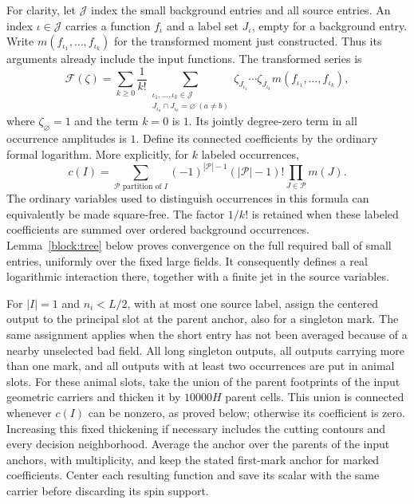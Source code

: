 For clarity, let $\mathcal J$ index the small background entries and all
source entries.  An index $\iota\in\mathcal J$ carries a function
$f_\iota$ and a label set $J_\iota$, empty for a background entry.  Write
$m(f_{\iota_1},\ldots,f_{\iota_k})$ for the transformed moment just
constructed.  Thus its arguments already include the input functions.
The transformed series is
\begin{equation}
 \mathcal F(\zeta)=\sum_{k\ge0}\frac1{k!}
    \sum_{\substack{\iota_1,\ldots,\iota_k\in\mathcal J\\
                  J_{\iota_a}\cap J_{\iota_b}=\varnothing\ (a\ne b)}}
       \zeta_{J_{\iota_1}}\cdots\zeta_{J_{\iota_k}}
                    m(f_{\iota_1},\ldots,f_{\iota_k}),
 \label{block:moment-series}
\end{equation}
where $\zeta_\varnothing=1$ and the term $k=0$ is $1$.
Its jointly degree-zero term in all occurrence amplitudes is $1$.
Define its connected coefficients by the ordinary formal logarithm.
More explicitly, for $k$ labeled occurrences,
\begin{equation}
 c(I)=\sum_{\mathcal P\text{ partition of }I}
       (-1)^{|\mathcal P|-1}(|\mathcal P|-1)!
                          \prod_{J\in\mathcal P}m(J).
 \label{block:partition-coefficient}
\end{equation}
The ordinary variables used to distinguish occurrences in this formula
can equivalently be made square-free.  The factor $1/k!$ is retained
when these labeled coefficients are summed over ordered background
occurrences.  Lemma~\ref{block:tree} below proves convergence on the full
required ball of small entries, uniformly over the fixed large fields.
It consequently defines a real logarithmic interaction there, together
with a finite jet in the source variables.

For $|I|=1$ and $n_i<L/2$, with at most one source label, assign the
centered output to the principal slot at the parent anchor, also for
a singleton mark.  The same assignment applies when the short entry has not been averaged because
of a nearby unselected bad field.  All long singleton outputs, all
outputs carrying more than one mark, and all outputs with at least
two occurrences are put in animal slots.  For these animal slots, take the union of the parent footprints of the
input geometric carriers and thicken it by $10000H$ parent cells.  This
union is connected whenever $c(I)$ can be nonzero, as proved below;
otherwise its coefficient is zero.  Increasing this fixed thickening
if necessary includes the cutting contours and every decision
neighborhood.  Average the anchor over the parents of the input
anchors, with multiplicity, and keep the stated first-mark anchor for
marked coefficients.  Center each resulting function and save its
scalar with the same carrier before discarding its spin support.

